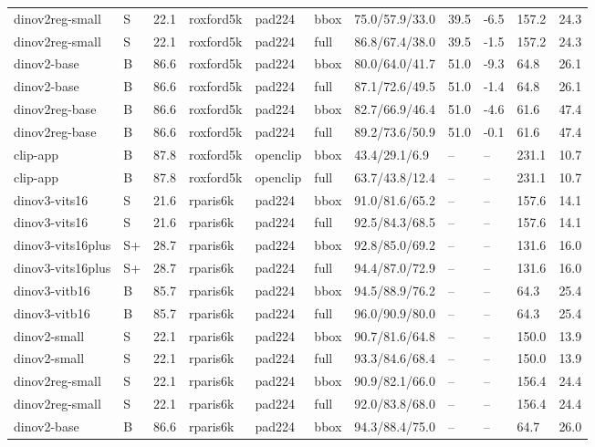 \begin{table}[ht]
\begin{tabular}{lllllllllll}
dinov2reg-small & S & 22.1 & roxford5k & pad224 & bbox & 75.0/57.9/33.0 & 39.5 & -6.5 & 157.2 & 24.3 \\
dinov2reg-small & S & 22.1 & roxford5k & pad224 & full & 86.8/67.4/38.0 & 39.5 & -1.5 & 157.2 & 24.3 \\
dinov2-base & B & 86.6 & roxford5k & pad224 & bbox & 80.0/64.0/41.7 & 51.0 & -9.3 & 64.8 & 26.1 \\
dinov2-base & B & 86.6 & roxford5k & pad224 & full & 87.1/72.6/49.5 & 51.0 & -1.4 & 64.8 & 26.1 \\
dinov2reg-base & B & 86.6 & roxford5k & pad224 & bbox & 82.7/66.9/46.4 & 51.0 & -4.6 & 61.6 & 47.4 \\
dinov2reg-base & B & 86.6 & roxford5k & pad224 & full & 89.2/73.6/50.9 & 51.0 & -0.1 & 61.6 & 47.4 \\
clip-app & B & 87.8 & roxford5k & openclip & bbox & 43.4/29.1/6.9 & – & – & 231.1 & 10.7 \\
clip-app & B & 87.8 & roxford5k & openclip & full & 63.7/43.8/12.4 & – & – & 231.1 & 10.7 \\
dinov3-vits16 & S & 21.6 & rparis6k & pad224 & bbox & 91.0/81.6/65.2 & – & – & 157.6 & 14.1 \\
dinov3-vits16 & S & 21.6 & rparis6k & pad224 & full & 92.5/84.3/68.5 & – & – & 157.6 & 14.1 \\
dinov3-vits16plus & S+ & 28.7 & rparis6k & pad224 & bbox & 92.8/85.0/69.2 & – & – & 131.6 & 16.0 \\
dinov3-vits16plus & S+ & 28.7 & rparis6k & pad224 & full & 94.4/87.0/72.9 & – & – & 131.6 & 16.0 \\
dinov3-vitb16 & B & 85.7 & rparis6k & pad224 & bbox & 94.5/88.9/76.2 & – & – & 64.3 & 25.4 \\
dinov3-vitb16 & B & 85.7 & rparis6k & pad224 & full & 96.0/90.9/80.0 & – & – & 64.3 & 25.4 \\
dinov2-small & S & 22.1 & rparis6k & pad224 & bbox & 90.7/81.6/64.8 & – & – & 150.0 & 13.9 \\
dinov2-small & S & 22.1 & rparis6k & pad224 & full & 93.3/84.6/68.4 & – & – & 150.0 & 13.9 \\
dinov2reg-small & S & 22.1 & rparis6k & pad224 & bbox & 90.9/82.1/66.0 & – & – & 156.4 & 24.4 \\
dinov2reg-small & S & 22.1 & rparis6k & pad224 & full & 92.0/83.8/68.0 & – & – & 156.4 & 24.4 \\
dinov2-base & B & 86.6 & rparis6k & pad224 & bbox & 94.3/88.4/75.0 & – & – & 64.7 & 26.0 \\

\end{tabular}
\end{table}
